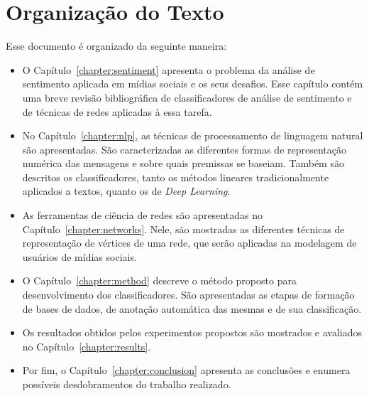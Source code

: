 \section{Organização do Texto}

Esse documento é organizado da seguinte maneira:

\begin{itemize}
    \item O Capítulo~\ref{chapter:sentiment} apresenta o problema da análise
        de sentimento aplicada em mídias sociais e os seus desafios.
        Esse capítulo contém uma breve revisão bibliográfica de classificadores
        de análise de sentimento e de técnicas de redes aplicadas à essa tarefa.
    \item No Capítulo~\ref{chapter:nlp}, as técnicas de processamento de
        linguagem natural são apresentadas.
        São caracterizadas as diferentes formas de representação numérica das
        mensagens e sobre quais premissas se baseiam.
        Também são descritos os classificadores, tanto os métodos lineares
        tradicionalmente aplicados a textos, quanto os de \textit{Deep Learning}.
    \item As ferramentas de ciência de redes são apresentadas no
        Capítulo~\ref{chapter:networks}.
        Nele, são mostradas as diferentes técnicas de representação de
        vértices de uma rede, que serão aplicadas na modelagem de usuários de
        mídias sociais.
    \item O Capítulo~\ref{chapter:method} descreve o método proposto para
        desenvolvimento dos classificadores.
        São apresentadas as etapas de formação de bases de dados, de anotação
        automática das mesmas e de sua classificação.
    \item Os resultados obtidos pelos experimentos propostos são mostrados e
        avaliados no Capítulo~\ref{chapter:results}.
    \item Por fim, o Capítulo~\ref{chapter:conclusion} apresenta as conclusões
        e enumera possíveis desdobramentos do trabalho realizado.
\end{itemize}
